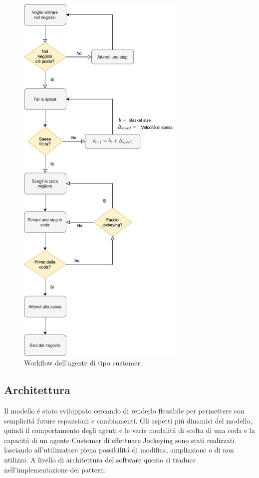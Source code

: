 \begin{figure}[htp!]
	\centering
	\hspace*{3cm}
	\includegraphics[width=8cm]{"images/workflow_customer.png"}
	\caption{Workflow dell'agente di tipo customer.}
	\label{fig:workflow_customer}
\end{figure}


\subsection{Architettura}
Il modello é stato sviluppato cercando di renderlo flessibile per
permettere con semplicitá future espansioni e cambiamenti. Gli aspetti
piú dinamici del modello, quindi il comportamento degli agenti e le
varie modalitá di scelta di una coda e la capacitá di un agente
Customer di effettuare Jockeying sono stati realizzati lasciando
all'utilizzatore piena possibilitá di modifica, ampliazione o di non
utilizzo. A livello di architettura del software questo si traduce
nell'implementazione dei pattern:

